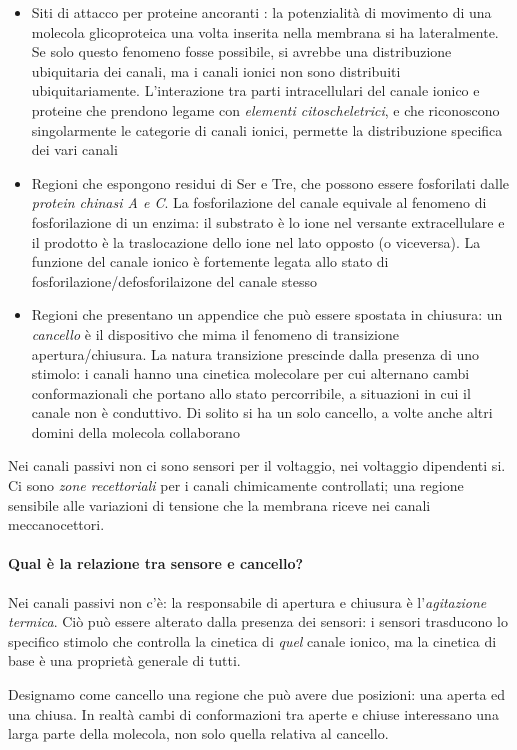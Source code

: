 \documentclass[a4paper,12pt]{article}
\begin{document}
\begin{itemize}
\item{Siti di attacco per proteine ancoranti : la potenzialità di movimento di una molecola glicoproteica una volta inserita nella membrana si ha lateralmente. Se solo questo fenomeno fosse possibile, si avrebbe una distribuzione ubiquitaria dei canali, ma i canali ionici non sono distribuiti ubiquitariamente. L'interazione tra parti intracellulari del canale ionico e proteine che prendono legame con \emph{elementi citoscheletrici}, e che riconoscono singolarmente le categorie di canali ionici, permette la distribuzione specifica dei vari canali}
\item{Regioni che espongono residui di Ser e Tre, che possono essere fosforilati dalle \emph{protein chinasi A e C}. La fosforilazione del canale equivale al fenomeno di fosforilazione di un enzima: il substrato è lo ione nel versante extracellulare e il prodotto è la traslocazione dello ione nel lato opposto (o viceversa). La funzione del canale ionico è fortemente legata allo stato di fosforilazione/defosforilaizone del canale stesso}
\item{Regioni che presentano un appendice che può essere spostata in chiusura: un \emph{cancello} è il dispositivo che mima il fenomeno di transizione apertura/chiusura. La natura transizione prescinde dalla presenza di uno stimolo: i canali hanno una cinetica molecolare per cui alternano cambi conformazionali che portano allo stato percorribile, a situazioni in cui il canale non è conduttivo. Di solito si ha un solo cancello, a volte anche altri domini della molecola collaborano}
\end{itemize}
Nei canali passivi non ci sono sensori per il voltaggio, nei voltaggio dipendenti si. Ci sono \emph{zone recettoriali} per i canali chimicamente controllati; una regione sensibile alle variazioni di tensione che la membrana riceve nei canali meccanocettori.

\paragraph{Qual è la relazione tra sensore e cancello?}
Nei canali passivi non c'è: la responsabile di apertura e chiusura è l'\emph{agitazione termica}. Ciò può essere alterato dalla presenza dei sensori: i sensori trasducono lo specifico stimolo che controlla la cinetica di \emph{quel} canale ionico, ma la cinetica di base è una proprietà generale di tutti.

Designamo come cancello una regione che può avere due posizioni: una aperta ed una chiusa. In realtà cambi di conformazioni tra aperte e chiuse interessano una larga parte della molecola, non solo quella relativa al cancello.
\end{document}
